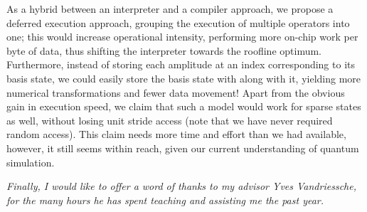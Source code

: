\documentclass[a4paper,11pt, oneside]{report}
\newcommand{\strongpar}{\medskip\par}
\begin{document}
As a hybrid between an interpreter and a compiler approach, we propose a deferred execution approach, grouping the execution of multiple operators into one; this would increase operational intensity, performing more on-chip work per byte of data, thus shifting the interpreter towards the roofline optimum. Furthermore, instead of storing each amplitude at an index corresponding to its basis state, we could easily store the basis state with along with it, yielding more numerical transformations and fewer data movement! Apart from the obvious gain in execution speed, we claim that such a model would work for sparse states as well, without losing unit stride access (note that we have never required random access). This claim needs more time and effort than we had available, however, it still seems within reach, given our current understanding of quantum simulation.

\strongpar
{\it Finally, I would like to offer a word of thanks to my advisor Yves Vandriessche, for the many hours he has spent teaching and assisting me the past year.}

\clearpage
\raggedright

\nocite{*}

\end{document}
